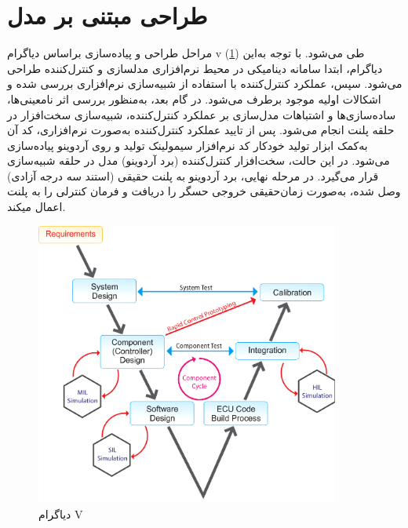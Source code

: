 \section{طراحی مبتنی بر مدل}
مراحل طراحی و پیاده‌سازی براساس دیاگرام v (\ref{Vdiag}) طی می‌شود. با توجه به‌این دیاگرام، ابتدا سامانه دینامیكی در محیط نرم‌افزاری مدلسازی و کنترل‌کننده طراحی می‌شود. سپس،  عملكرد کنترل‌کننده با استفاده از شبیه‌سازی نرم‌افزاری بررسی شده و اشكالات اولیه موجود برطرف می‌شود. در گام بعد، به‌منظور بررسی اثر نامعینی‌ها، ساده‌سازی‌ها و اشتباهات مدل‌سازی بر عملكرد کنترل‌کننده، شبیه‌سازی سخت‌افزار در حلقه پلنت
انجام می‌شود. پس از تایید عملكرد کنترل‌کننده به‌صورت نرم‌افزاری، کد آن به‌کمک ابزار تولید خودکار کد نرم‌افزار سیمولینک تولید و روی آردوینو پیاده‌سازی می‌شود. در این حالت، سخت‌افزار کنترل‌کننده (برد آردوینو) مدل در حلقه شبیه‌سازی قرار می‌گیرد. در مرحله نهایی، برد آردوینو به پلنت حقیقی (استند سه درجه آزادی) وصل شده، به‌صورت
زمان‌حقیقی خروجی حسگر را دریافت و فرمان کنترلی را به پلنت اعمال میکند.
\begin{figure}[H]
	\includegraphics[width=10cm]{../../Figures/QuadSimulation/ModelBasedDesign.png}
	\centering
	\caption{دیاگرام V 
		\cite{Vdiagram}}
	\label{Vdiag}
\end{figure}